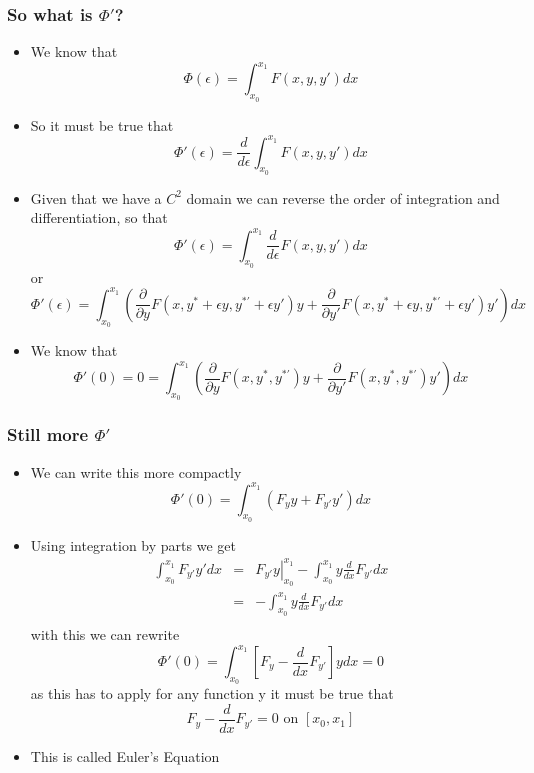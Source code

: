 \documentclass[10pt]{beamer}
\begin{document}
\begin{frame}
  \frametitle{So what is $\Phi{'}$?}
  \begin{itemize}
  \item We know that
    \[
      \Phi(\epsilon) = \int_{x_0}^{x_1} F(x, y, y{'}) dx
    \]
  \item So it must be true that
    \[
      \Phi'(\epsilon) = \frac{d}{d \epsilon} \int_{x_0}^{x_1} F(x, y, y{'}) dx
    \]
  \item Given that we have a $C^{2}$ domain we can reverse the order of
    integration and differentiation, so that
    \[
      \Phi{'}(\epsilon) =  \int_{x_0}^{x_1} \frac{d}{d \epsilon} F(x, y, y{'}) dx
    \] \pause or
    \[
      \Phi{'}( \epsilon ) =  \int_{x_0}^{x_1} \left(
        \frac{\partial}{\partial y} F(x, y^{*} +  \epsilon y, y^{*'}+ \epsilon y{'} ) y +  
        \frac{\partial}{\partial y{'}} F ( x, y^{*} + \epsilon y, y^{*'}+ \epsilon y{'} ) y{'} 
        \right) dx
    \]
  \item We know that
    \[
      \Phi{'}(0) = 0 = \int_{x_0}^{x_1} \left( 
       \frac{\partial}{\partial y}  F ( x, y^{*}, y^{*'} ) y + 
       \frac{\partial }{\partial y{'}}  F( x, y^{*} , y^{*'} ) y{'} 
       \right)  dx
    \]
  \end{itemize}
\end{frame}

\begin{frame}
  \frametitle{Still more $\Phi{'}$}
  \begin{itemize}
  \item We can write this more compactly
    \[
      \Phi{'}(0)= \int_{x_0}^{x_1} \left( F_y y + F_{y'} y' \right) dx
    \]
  \item Using integration by parts we get
    \[
      \begin{array}{rcl}
        \int_{x_0}^{x_1} F_{y'} y' dx &=& \left. F_{y'} y \right\vert_{x_0}^{x_1} - \int_{x_0}^{x_1} y \frac{d}{dx} F_{y'} dx\\
        &=& - \int_{x_0}^{x_1} y \frac{d}{dx} F_{y'} dx\\
      \end{array}
    \] with this we can rewrite
    \[
      \Phi{'}(0)= \int_{x_0}^{x_1} \left[ F_y - \frac{d}{dx} F_{y'} \right] y dx = 0
    \] as this has to apply for any function y it must be true that
    \[
      F_y - \frac{d}{dx} F_{y'} = 0 \mbox{ on } [x_0, x_1]
    \]
  \item This is called Euler's Equation
  \end{itemize}
\end{frame}
\end{document}

